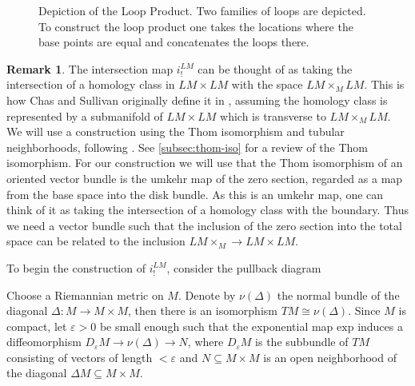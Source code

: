 \documentclass{scrartcl}
\theoremstyle{plain}
\theoremstyle{definition}
\newtheorem{remark}[theorem]{Remark}
\renewcommand{\epsilon}{\varepsilon}
\renewcommand{\subset}{\subseteq}
\newcommand{\iso}{\cong}
\begin{document}
\begin{figure}[ht]
    \centering
    
    \caption{Depiction of the Loop Product. Two families of loops are depicted. To construct the loop product one takes the locations where the base points are equal and concatenates the loops there. }
\end{figure}

\begin{remark}
The intersection map $i_!^{LM}$ can be thought of as taking the intersection of a homology class in $LM\times LM$ with the space $LM\times_M LM$. This is how Chas and Sullivan originally define it in \cite{chas1999string}, assuming the homology class is represented by a submanifold of $LM\times LM$ which is transverse to $LM\times_M LM$. 
We will use a construction using the Thom isomorphism and tubular neighborhoods, following \cite{cohen2002homotopy}. See \cref{subsec:thom-iso} for a review of the Thom isomorphism. For our construction we will use that the Thom isomorphism of an oriented vector bundle is the umkehr map of the zero section, regarded as a map from the base space into the disk bundle. As this is an umkehr map, one can think of it as taking the intersection of a homology class with the boundary. Thus we need a vector bundle such that the inclusion of the zero section into the total space can be related to the inclusion $LM\times_M \to LM\times LM$. 
\end{remark}

To begin the construction of $i_!^{LM}$, consider the pullback diagram
\begin{center}
\end{center}

Choose a Riemannian metric on $M$. Denote by $\nu(\Delta)$ the normal bundle of the diagonal $\Delta\colon M\to M\times M$, then there is an isomorphism $TM\iso \nu(\Delta)$. Since $M$ is compact, let $\epsilon>0$ be small enough such that the exponential map $\mathrm{exp}$ induces a diffeomorphism $D_\epsilon M\to \nu(\Delta)\to N$, where $D_\epsilon M$ is the subbundle of $TM$ consisting of vectors of length $<\epsilon$ and $N\subset M\times M$ is an open neighborhood of the diagonal $\Delta M\subset M\times M$. 
\end{document}
